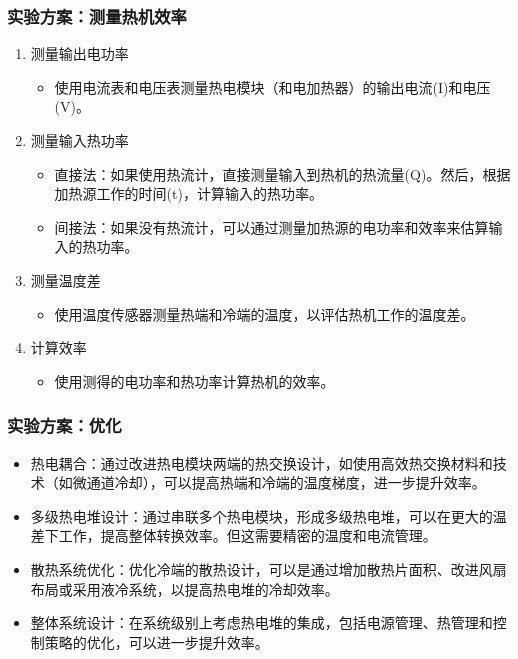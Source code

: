 \documentclass[aspectratio=169]{beamer}
\begin{document}
	\begin{frame}
		\frametitle{实验方案：测量热机效率}
		
		\begin{enumerate}
			\item 测量输出电功率
			\begin{itemize}
				\item 使用电流表和电压表测量热电模块（和电加热器）的输出电流(I)和电压(V)。 
			\end{itemize}
			
			\item 测量输入热功率
			\begin{itemize}
				\item 直接法：如果使用热流计，直接测量输入到热机的热流量(Q)。然后，根据加热源工作的时间(t)，计算输入的热功率。
				\item 间接法：如果没有热流计，\textcolor{c4}{可以通过测量加热源的电功率和效率来估算输入的热功率}。
			\end{itemize}
			
			\item \textcolor{c4}{测量温度差}
			\begin{itemize}
				\item 使用温度传感器测量热端和冷端的温度，以评估热机工作的温度差。
			\end{itemize}
			
			\item 计算效率
			\begin{itemize}
				\item 使用测得的电功率和热功率计算热机的效率。
			\end{itemize}
		\end{enumerate}
	\end{frame}
	
	\begin{frame}
		\frametitle{实验方案：优化}
		
		\begin{itemize}
			\item 热电耦合：通过改进热电模块两端的热交换设计，如使用高效热交换材料和技术（如\textcolor{c4}{微通道冷却}），可以提高热端和冷端的温度梯度，进一步提升效率。
			
			\item \textcolor{c4}{多级热电堆}设计：通过串联多个热电模块，形成多级热电堆，可以在更大的温差下工作，提高整体转换效率。但这需要精密的温度和电流管理。
			
			\item 散热系统优化：\textcolor{c4}{优化冷端的散热设计}，可以是通过增加散热片面积、改进风扇布局或采用液冷系统，以提高热电堆的冷却效率。
			
			\item 整体系统设计：\textcolor{c4}{在系统级别上考虑热电堆的集成}，包括电源管理、热管理和控制策略的优化，可以进一步提升效率。
		\end{itemize}
		
	\end{frame}
	
\end{document}
